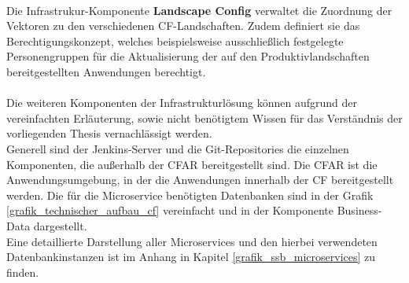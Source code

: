 \\
\newpage
Die Infrastrukur-Komponente \textbf{Landscape Config} verwaltet die Zuordnung der Vektoren zu den verschiedenen \ac{CF}-Landschaften. Zudem definiert sie das Berechtigungskonzept, welches beispielsweise ausschließlich festgelegte Personengruppen für die Aktualisierung der auf den Produktivlandschaften bereitgestellten Anwendungen berechtigt.\\
\\
Die weiteren Komponenten der Infrastrukturlösung können aufgrund der vereinfachten Erläuterung, sowie nicht benötigtem Wissen für das Verständnis der vorliegenden Thesis vernachlässigt werden.\\
Generell sind der Jenkins-Server und die Git-Repositories die einzelnen Komponenten, die außerhalb der \ac{CFAR} bereitgestellt sind. Die \ac{CFAR} ist die Anwendungsumgebung, in der die Anwendungen innerhalb der \ac{CF} bereitgestellt werden. Die für die Microservice benötigten Datenbanken sind in der Grafik \ref{grafik_technischer_aufbau_cf} vereinfacht und in der Komponente Business-Data dargestellt.\\
Eine detaillierte Darstellung aller Microservices und den hierbei verwendeten Datenbankinstanzen ist im Anhang in Kapitel \ref{grafik_ssb_microservices} zu finden.


